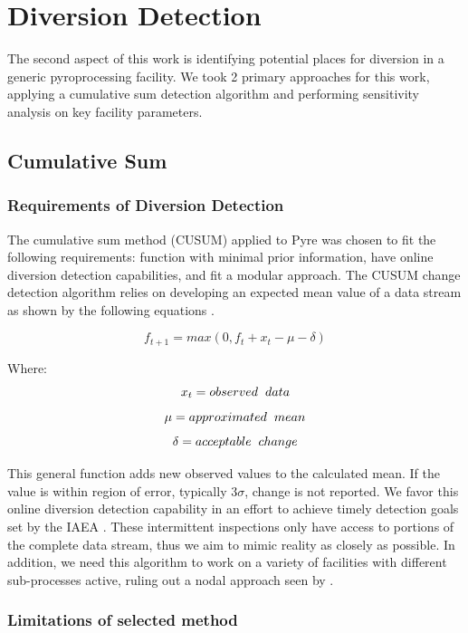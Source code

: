 \chapter[Diversion Detection]{Diversion Detection}

The second aspect of this work is identifying potential places for diversion in a generic pyroprocessing facility. We took 2 primary approaches for this work, applying
a cumulative sum detection algorithm and performing sensitivity analysis on key facility parameters. 
\section{Cumulative Sum}

\subsection{Requirements of Diversion Detection}


The cumulative sum method (CUSUM) applied to Pyre was chosen to fit the following requirements: function with minimal prior information, have online diversion detection
capabilities, and fit a modular approach. The CUSUM change detection algorithm relies on developing an expected mean value of a data stream as shown by the following equations \cite{basseville_detection_1993}.

\[ f_{t+1} = max(0, f_t + x_t - \mu - \delta) \]

Where:
\[ x_t = observed \hspace{2mm} data \]
\[ \mu = approximated \hspace{2mm} mean \]
\[ \delta = acceptable \hspace{2mm} change \]

This general function adds new observed values to the calculated mean. If the value is within region of error, typically 3$\sigma$, change is not reported. 
We favor this online diversion detection capability in an effort to achieve timely detection goals set by the IAEA \cite{international_atomic_energy_agency_implications_2004}.
These intermittent inspections only have access to portions of the complete data stream, thus we aim to mimic reality as closely as possible. In addition, we need this
algorithm to work on a variety of facilities with different sub-processes active, ruling out a nodal approach seen by \cite{Yilmaz_2016}.

\subsection{Limitations of selected method}


